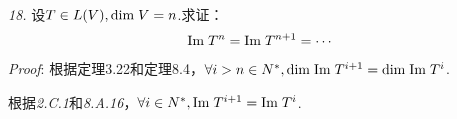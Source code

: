 \hspace*{\fill}

\textit{18.}
设$T \in L(V),\mathrm{dim \;} V=n$.求证：
    \begin{align*}
        \mathrm{Im \;} T^n=\mathrm{Im \;} T^{n+1}=\cdots
    \end{align*}
\textit{Proof}:
根据定理3.22和定理8.4，$\forall i>n \in N^*,\mathrm{dim \;} \mathrm{Im \;} T^{i+1}=\mathrm{dim \;} \mathrm{Im \;} T^i$.

根据\textit{2.C.1}和\textit{8.A.16}，$\forall i \in N^*,\mathrm{Im \;} T^{i+1}=\mathrm{Im \;} T^i$.

